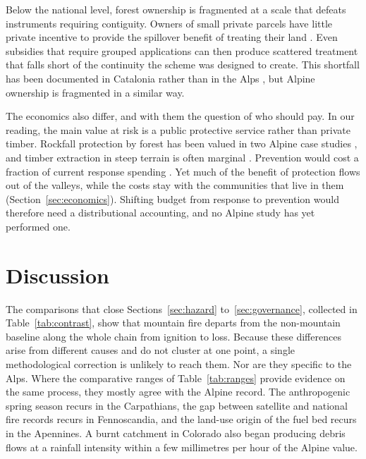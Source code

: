 \documentclass[11pt,a4paper]{article}
\begin{document}
Below the national level, forest ownership is fragmented at a scale that defeats instruments requiring contiguity. Owners of small private parcels have little private incentive to provide the spillover benefit of treating their land \citep{bayham_economics_2022}. Even subsidies that require grouped applications can then produce scattered treatment that falls short of the continuity the scheme was designed to create. This shortfall has been documented in Catalonia rather than in the Alps \citep{gorrizmifsud_current_2026}, but Alpine ownership is fragmented in a similar way.

The economics also differ, and with them the question of who should pay. In our reading, the main value at risk is a public protective service rather than private timber. Rockfall protection by forest has been valued in two Alpine case studies \citep{accastello_asforesee_2019, moos_climate_2021}, and timber extraction in steep terrain is often marginal \citep{dinca_timber_2025}. Prevention would cost a fraction of current response spending \citep{muller_forest_2020}. Yet much of the benefit of protection flows out of the valleys, while the costs stay with the communities that live in them (Section~\ref{sec:economics}). Shifting budget from response to prevention would therefore need a distributional accounting, and no Alpine study has yet performed one.
\section{Discussion}
\label{sec:discussion}

The comparisons that close Sections~\ref{sec:hazard} to~\ref{sec:governance}, collected in Table~\ref{tab:contrast}, show that mountain fire departs from the non-mountain baseline along the whole chain from ignition to loss. Because these differences arise from different causes and do not cluster at one point, a single methodological correction is unlikely to reach them. Nor are they specific to the Alps. Where the comparative ranges of Table~\ref{tab:ranges} provide evidence on the same process, they mostly agree with the Alpine record. The anthropogenic spring season recurs in the Carpathians, the gap between satellite and national fire records recurs in Fennoscandia, and the land-use origin of the fuel bed recurs in the Apennines. A burnt catchment in Colorado also began producing debris flows at a rainfall intensity within a few millimetres per hour of the Alpine value.
\end{document}
